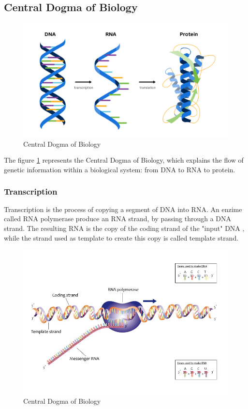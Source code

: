\subsection{Central Dogma of Biology}
\label{sec:central-dogma}
\begin{figure}[h!]
	\includegraphics[scale=.27]{res/proteins_overview/central_dogma.png}
	\centering
	\caption{Central Dogma of Biology}
	\label{fig:central-dogma}
\end{figure}

The figure \ref{fig:central-dogma} represents the Central Dogma of Biology, which explains the flow of genetic information within a biological system: from DNA to RNA to protein.

\pagebreak

\subsubsection{Transcription}
Transcription is the process of copying a segment of DNA into RNA. An enzime called RNA polymerase produce an RNA strand, by passing through a DNA strand. The resulting RNA is the copy of the coding strand of the "input" DNA , while the strand used as template to create this copy is called template strand.

\begin{figure}[h!]
	\includegraphics[scale=.6]{res/proteins_overview/rna_polymerase.jpeg}
	\centering
	\caption{Central Dogma of Biology}
	\label{fig:transcription}
\end{figure}

